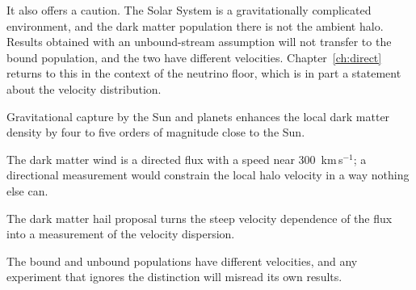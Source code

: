 It also offers a caution. The Solar System is a gravitationally complicated
environment, and the dark matter population there is not the ambient halo.
Results obtained with an unbound-stream assumption will not transfer to the
bound population, and the two have different velocities. Chapter~\ref{ch:direct}
returns to this in the context of the neutrino floor, which is in part a
statement about the velocity distribution.

\begin{keytakeaways}
\item Gravitational capture by the Sun and planets enhances the local dark
matter density by four to five orders of magnitude close to the Sun.
\item The dark matter wind is a directed flux with a speed near
300~km\,s$^{-1}$; a directional measurement would constrain the local halo
velocity in a way nothing else can.
\item The dark matter hail proposal turns the steep velocity dependence of
the flux into a measurement of the velocity dispersion.
\item The bound and unbound populations have different velocities, and any
experiment that ignores the distinction will misread its own results.
\end{keytakeaways}
